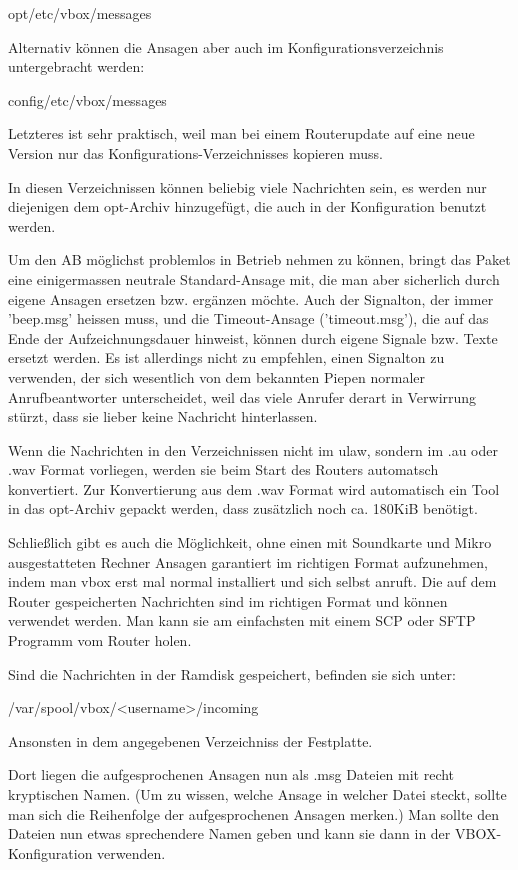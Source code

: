 opt/etc/vbox/messages

Alternativ können die Ansagen aber auch im Konfigurationsverzeichnis untergebracht werden:

config/etc/vbox/messages

Letzteres ist sehr praktisch, weil man bei einem Routerupdate auf eine neue Version
nur das Konfigurations-Verzeichnisses kopieren muss.

In diesen Verzeichnissen können beliebig viele Nachrichten sein, es werden nur diejenigen
dem opt-Archiv hinzugefügt, die auch in der Konfiguration benutzt werden.

Um den AB möglichst problemlos in Betrieb nehmen zu können, bringt das Paket eine einigermassen neutrale 
Standard-Ansage mit, die man aber sicherlich durch eigene Ansagen ersetzen bzw. ergänzen möchte. Auch der 
Signalton, der immer 'beep.msg' heissen muss, und die Timeout-Ansage ('timeout.msg'), die auf das Ende 
der Aufzeichnungsdauer hinweist, können durch eigene Signale bzw. Texte ersetzt werden. 
Es ist allerdings nicht zu empfehlen, einen Signalton zu verwenden, der sich wesentlich von dem 
bekannten Piepen normaler Anrufbeantworter unterscheidet, weil das viele Anrufer derart in Verwirrung 
stürzt, dass sie lieber keine Nachricht hinterlassen.

Wenn die Nachrichten in den Verzeichnissen nicht im ulaw, sondern im .au oder .wav Format vorliegen,
werden sie beim Start des Routers automatsch konvertiert. Zur Konvertierung aus dem .wav Format wird
automatisch ein Tool in das opt-Archiv gepackt werden, dass zusätzlich noch ca. 180KiB benötigt.

Schließlich gibt es auch die Möglichkeit, ohne einen mit Soundkarte und Mikro ausgestatteten Rechner 
Ansagen garantiert im richtigen Format aufzunehmen, indem man vbox erst mal normal installiert und 
sich selbst anruft. Die auf dem Router gespeicherten Nachrichten sind im richtigen Format
und können verwendet werden. Man kann sie am einfachsten mit einem SCP oder SFTP Programm vom Router
holen.

Sind die Nachrichten in der Ramdisk gespeichert, befinden sie sich unter:

/var/spool/vbox/<username>/incoming

Ansonsten in dem angegebenen Verzeichniss der Festplatte.

Dort liegen die aufgesprochenen Ansagen nun als .msg Dateien mit recht kryptischen Namen. 
(Um zu wissen, welche Ansage in welcher Datei steckt, sollte man sich die Reihenfolge der 
aufgesprochenen Ansagen merken.) Man sollte den Dateien nun etwas sprechendere Namen geben und 
kann sie dann in der VBOX-Konfiguration verwenden.

